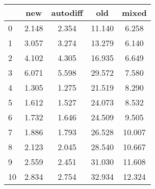 \begin{tabular}{l|cccc}
\toprule
{} &   new &  autodiff &    old &  mixed \\
\midrule
0  & 2.148 &     2.354 & 11.140 &  6.258 \\
1  & 3.057 &     3.274 & 13.279 &  6.140 \\
2  & 4.102 &     4.305 & 16.935 &  6.649 \\
3  & 6.071 &     5.598 & 29.572 &  7.580 \\
4  & 1.305 &     1.275 & 21.519 &  8.290 \\
5  & 1.612 &     1.527 & 24.073 &  8.532 \\
6  & 1.732 &     1.646 & 24.509 &  9.505 \\
7  & 1.886 &     1.793 & 26.528 & 10.007 \\
8  & 2.123 &     2.045 & 28.540 & 10.667 \\
9  & 2.559 &     2.451 & 31.030 & 11.608 \\
10 & 2.834 &     2.754 & 32.934 & 12.324 \\
\bottomrule
\end{tabular}
